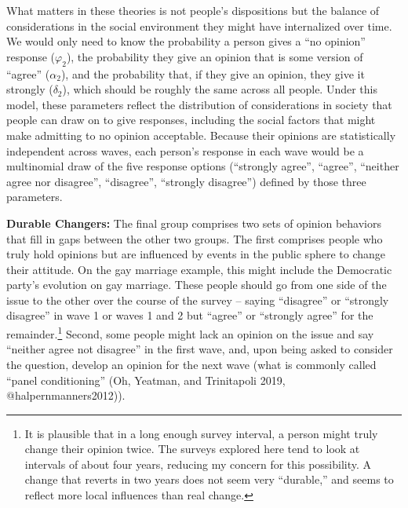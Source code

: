 \documentclass[12pt,]{article}
\begin{document}
What matters in these theories is not people's dispositions but the balance of considerations in the social environment they might have internalized over time. We would only need to know the probability a person gives a ``no opinion'' response (\(\varphi_2\)), the probability they give an opinion that is some version of ``agree'' (\(\alpha_2\)), and the probability that, if they give an opinion, they give it strongly (\(\delta_2\)), which should be roughly the same across all people. Under this model, these parameters reflect the distribution of considerations in society that people can draw on to give responses, including the social factors that might make admitting to no opinion acceptable. Because their opinions are statistically independent across waves, each person's response in each wave would be a multinomial draw of the five response options (``strongly agree'', ``agree'', ``neither agree nor disagree'', ``disagree'', ``strongly disagree'') defined by those three parameters.

\textbf{Durable Changers:} The final group comprises two sets of opinion behaviors that fill in gaps between the other two groups. The first comprises people who truly hold opinions but are influenced by events in the public sphere to change their attitude. On the gay marriage example, this might include the Democratic party's evolution on gay marriage. These people should go from one side of the issue to the other over the course of the survey -- saying ``disagree'' or ``strongly disagree'' in wave 1 or waves 1 and 2 but ``agree'' or ``strongly agree'' for the remainder.\footnote{It is plausible that in a long enough survey interval, a person might truly change their opinion twice. The surveys explored here tend to look at intervals of about four years, reducing my concern for this possibility. A change that reverts in two years does not seem very ``durable,'' and seems to reflect more local influences than real change.} Second, some people might lack an opinion on the issue and say ``neither agree not disagree'' in the first wave, and, upon being asked to consider the question, develop an opinion for the next wave (what is commonly called ``panel conditioning'' (Oh, Yeatman, and Trinitapoli 2019, @halpernmanners2012)).
\end{document}
